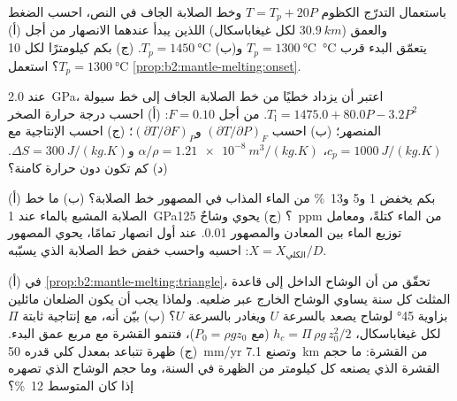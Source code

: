 \begin{exercise}[$\star\star$]\label{exo:b2:mantle-melting:7}
باستعمال التدرّج الكظوم $T = T_p + 20P$ وخط الصلابة الجاف في النص، احسب
الضغط والعمق ($\qty{30.9}{km}$ لكل غيغاباسكال) اللذين يبدأ عندهما الانصهار
من أجل (أ) $T_p = \qty{1300}{\celsius}$ و(ب) $T_p = \qty{1450}{\celsius}$. (ج) بكم
كيلومترًا لكل \qty{10}{\celsius} يتعمّق البدء قرب
$T_p = \qty{1300}{\celsius}$؟ استعمل \cref{prop:b2:mantle-melting:onset}.
\end{exercise}

\begin{exercise}[$\star\star$]\label{exo:b2:mantle-melting:8}
عند \qty{2.0}{GPa}، اعتبر أن  يزداد خطيًا من خط الصلابة الجاف إلى
خط سيولة  $T_{\mathrm l} = 1475.0 + 80.0P - 3.2P^2$. من أجل $F = 0.10$:
(أ) احسب درجة حرارة الصخر المنصهر؛ (ب) احسب $(\partial
T/\partial P)_F$ و$(\partial T/\partial F)_P$؛ (ج) احسب الإنتاجية مع
$c_p = \qty{1000}{J/(kg.K)}$، $\alpha/\rho = \qty{1.21e-8}{m^3/(kg.K)}$
و$\Delta S = \qty{300}{J/(kg.K)}$. (د) كم تكون دون حرارة كامنة؟
\end{exercise}

\begin{exercise}[$\star\star$]\label{exo:b2:mantle-melting:9}
(أ) بكم يخفض 1 و5 و\qty{13}{\percent} من الماء المذاب في المصهور
خط الصلابة؟ (ب) ما خط الصلابة المشبع بالماء عند \qty{1}{GPa}؟ (ج) يحوي وشاحٌ
\qty{125}{ppm} من الماء كتلةً، ومعامل توزيع الماء بين
المعادن والمصهور 0.01. عند أول انصهار تمامًا، يحوي المصهور $X =
X_{\text{الكلي}}/D$: احسبه واحسب خفض خط الصلابة الذي يسبّبه.
\end{exercise}

\begin{exercise}[$\star\star\star$]\label{exo:b2:mantle-melting:10}
(أ) في \cref{prop:b2:mantle-melting:triangle}، تحقّق من أن الوشاح الداخل إلى
قاعدة المثلث كل سنة يساوي الوشاح الخارج عبر ضلعيه. ولماذا
يجب أن يكون الضلعان مائلين بزاوية \ang{45} لوشاح يصعد بالسرعة $U$ ويغادر بالسرعة $U$؟
(ب) بيّن أنه، مع إنتاجية ثابتة $\Pi$ لكل غيغاباسكال، $h_c = \Pi\,\rho
g\,z_0^2/2$ (مع $P_0 = \rho g z_0$)، فتنمو القشرة مع مربع
عمق البدء. (ج) ظهرة تتباعد بمعدل كلي قدره \qty{50}{mm/yr}
وتصنع \qty{7.1}{km} من القشرة: ما حجم القشرة الذي يصنعه كل كيلومتر من الظهرة
في السنة، وما حجم الوشاح الذي تصهره إذا كان  المتوسط
\qty{12}{\percent}؟
\end{exercise}

